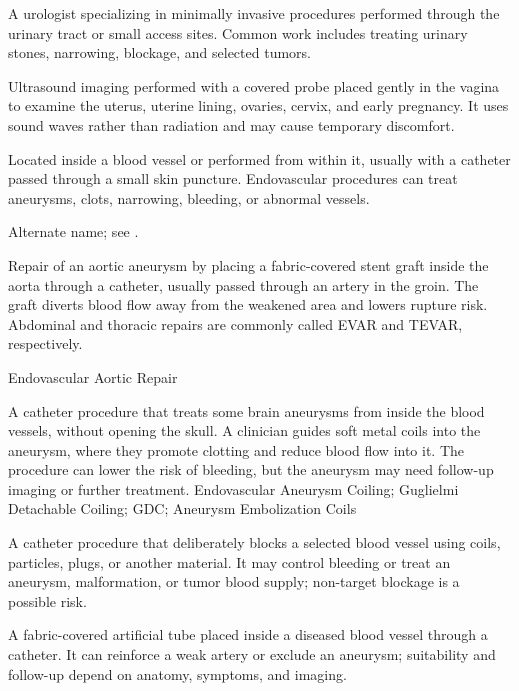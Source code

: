  A urologist specializing in minimally invasive procedures performed through the urinary tract or small access sites. Common work includes treating urinary stones, narrowing, blockage, and selected tumors.

 Ultrasound imaging performed with a covered probe placed gently in the vagina to examine the uterus, uterine lining, ovaries, cervix, and early pregnancy. It uses sound waves rather than radiation and may cause temporary discomfort.

 Located inside a blood vessel or performed from within it, usually with a catheter passed through a small skin puncture. Endovascular procedures can treat aneurysms, clots, narrowing, bleeding, or abnormal vessels.

 Alternate name; see .

 Repair of an aortic aneurysm by placing a fabric-covered stent graft inside the aorta through a catheter, usually passed through an artery in the groin. The graft diverts blood flow away from the weakened area and lowers rupture risk. Abdominal and thoracic repairs are commonly called EVAR and TEVAR, respectively.

\synonyms
Endovascular Aortic Repair

 A catheter procedure that treats some brain aneurysms from inside the blood vessels, without opening the skull. A clinician guides soft metal coils into the aneurysm, where they promote clotting and reduce blood flow into it. The procedure can lower the risk of bleeding, but the aneurysm may need follow-up imaging or further treatment.
\synonyms
Endovascular Aneurysm Coiling; Guglielmi Detachable Coiling; GDC; Aneurysm Embolization Coils

 A catheter procedure that deliberately blocks a selected blood vessel using coils, particles, plugs, or another material. It may control bleeding or treat an aneurysm, malformation, or tumor blood supply; non-target blockage is a possible risk.

 A fabric-covered artificial tube placed inside a diseased blood vessel through a catheter. It can reinforce a weak artery or exclude an aneurysm; suitability and follow-up depend on anatomy, symptoms, and imaging.

